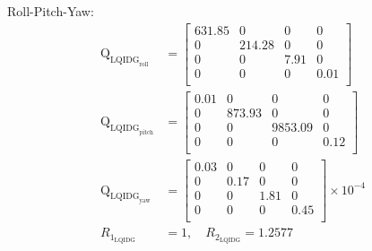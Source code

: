 \documentclass[conference]{IEEEtran}
\begin{document}
Roll-Pitch-Yaw:
\begin{equation}
	\begin{split}
		\boldsymbol{\mathrm{Q}}_{{\text{LQIDG}_{\text{roll}}}} &= \begin{bmatrix}
			631.85 & 0 & 0 & 0  \\ 
			0 & 214.28 & 0 & 0  \\ 
			0 & 0 & 7.91 & 0  \\ 
			0 & 0 & 0 & 0.01  \\ 
		\end{bmatrix} \\[1em]
		\boldsymbol{\mathrm{Q}}_{{\text{LQIDG}_{\text{pitch}}}} &= \begin{bmatrix}
			0.01 & 0 & 0 & 0  \\
			0 & 873.93 & 0 & 0  \\ 
			0 & 0 & 9853.09 & 0 \\ 
			0 & 0 & 0 & 0.12  \\ 
		\end{bmatrix}\\[1em]
		\boldsymbol{\mathrm{Q}}_{{\text{LQIDG}_{\text{yaw}}}}  &= \begin{bmatrix}
			0.03 & 0 & 0 & 0 \\ 
			0 & 0.17 & 0 & 0 \\ 
			0 & 0 & 1.81 & 0 \\ 
			0 & 0 & 0 & 0.45 \\
		\end{bmatrix}\times 10^{-4}\\[1em]
          R_{1_{\text{LQIDG}}} &= 1, \quad  R_{2_{\text{LQIDG}}} = 1.2577
	\end{split}
\end{equation}










\end{document}
